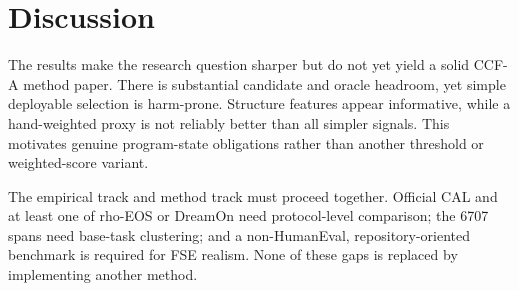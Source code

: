 \section{Discussion}
The results make the research question sharper but do not yet yield a solid CCF-A method paper. There is substantial candidate and oracle headroom, yet simple deployable selection is harm-prone. Structure features appear informative, while a hand-weighted proxy is not reliably better than all simpler signals. This motivates genuine program-state obligations rather than another threshold or weighted-score variant.

The empirical track and method track must proceed together. Official CAL and at least one of rho-EOS or DreamOn need protocol-level comparison; the 6707 spans need base-task clustering; and a non-HumanEval, repository-oriented benchmark is required for FSE realism. None of these gaps is replaced by implementing another method.
